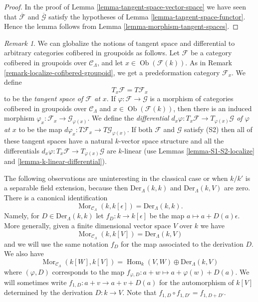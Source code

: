 \documentclass{stacks-project}
\theoremstyle{plain}
\theoremstyle{definition}
\theoremstyle{remark}
\newtheorem{remark}[subsection]{Remark}
\numberwithin{equation}{subsection}
\def\Hom{\mathop{\mathrm{Hom}}\nolimits}
\def\Mor{\mathop{\mathrm{Mor}}\nolimits}
\def\Ob{\mathop{\mathrm{Ob}}\nolimits}
\begin{document}
\begin{proof}
In the proof of
Lemma \ref{lemma-tangent-space-vector-space}
we have seen that $\overline{\mathcal{F}}$ and $\overline{\mathcal{G}}$
satisfy the hypotheses of
Lemma \ref{lemma-tangent-space-functor}.
Hence the lemma follows from
Lemma \ref{lemma-morphism-tangent-spaces}.
\end{proof}

\begin{remark}
\label{remark-tangent-space-cofibered-groupoid}
We can globalize the notions of tangent space and differential to arbitrary
categories cofibered in groupoids as follows. Let $\mathcal{F}$ be a category
cofibered in groupoids over $\mathcal{C}_\Lambda$, and let
$x \in \Ob(\mathcal{F}(k))$. As in
Remark \ref{remark-localize-cofibered-groupoid},
we get a predeformation category $\mathcal{F}_x$. We define
$$
T_x\mathcal{F} = T\mathcal{F}_x
$$
to be the {\it tangent space of $\mathcal{F}$ at $x$}. If
$\varphi : \mathcal{F} \to \mathcal{G}$ is a morphism of categories cofibered
in groupoids over $\mathcal{C}_\Lambda$ and $x \in \Ob(\mathcal{F}(k))$,
then there is an induced morphism
$\varphi_x: \mathcal{F}_x \to \mathcal{G}_{\varphi(x)}$. We define the
{\it differential
$d_x \varphi : T_x \mathcal{F} \to T_{\varphi(x)} \mathcal{G}$
of $\varphi$ at $x$} to be the map
$d \varphi_x: T \mathcal{F}_x \to T \mathcal{G}_{\varphi(x)}$.
If both $\mathcal{F}$ and $\mathcal{G}$ satisfy (S2) then
all of these tangent spaces have a natural $k$-vector space structure
and all the differentials
$d_x \varphi : T_x \mathcal{F} \to T_{\varphi(x)} \mathcal{G}$
are $k$-linear (use
Lemmas \ref{lemma-S1-S2-localize} and \ref{lemma-k-linear-differential}).
\end{remark}

\noindent
The following observations are uninteresting in the classical case or when
$k/k'$ is a separable field extension, because then
$\text{Der}_\Lambda(k, k)$ and $\text{Der}_\Lambda(k, V)$ are zero.
There is a canonical identification
$$
\Mor_{\mathcal{C}_\Lambda}(k, k[\epsilon]) =
\text{Der}_\Lambda(k, k).
$$
Namely, for $D \in \text{Der}_\Lambda(k, k)$ let $f_D : k \to k[\epsilon]$
be the map $a \mapsto a + D(a)\epsilon$. More generally, given a finite
dimensional vector space $V$ over $k$ we have
$$
\Mor_{\mathcal{C}_\Lambda}(k, k[V]) =
\text{Der}_\Lambda(k, V)
$$
and we will use the same notation $f_D$ for the map associated to the
derivation $D$. We also have
$$
\Mor_{\mathcal{C}_\Lambda}(k[W], k[V]) =
\Hom_k(V, W) \oplus \text{Der}_\Lambda(k, V)
$$
where $(\varphi, D)$ corresponds to the map
$f_{\varphi, D} : a + w \mapsto a + \varphi(w) + D(a)$. We will sometimes write
$f_{1, D} : a + v \to a + v + D(a)$ for the automorphism
of $k[V]$ determined by the derivation $D : k \to V$. Note that
$f_{1, D} \circ f_{1, D'} = f_{1, D + D'}$.
\end{document}
